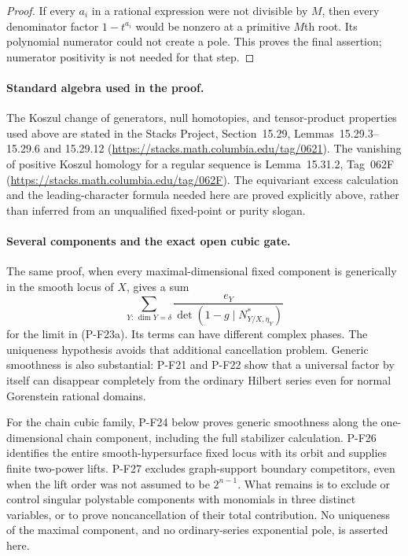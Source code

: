 \begin{proof}
If every $a_i$ in a rational expression were not divisible
by $M$, then every denominator factor $1-t^{a_i}$ would
be nonzero at a primitive $M$th root. Its polynomial numerator
could not create a pole. This proves the final assertion;
numerator positivity is not needed for that step.
\end{proof}

\paragraph{Standard algebra used in the proof.}
The Koszul change of generators, null homotopies, and tensor-product
properties used above are stated in the Stacks Project,
Section~15.29, Lemmas~15.29.3--15.29.6 and 15.29.12
(\url{https://stacks.math.columbia.edu/tag/0621}). The vanishing
of positive Koszul homology for a regular sequence is
Lemma~15.31.2, Tag~062F
(\url{https://stacks.math.columbia.edu/tag/062F}). The
equivariant excess calculation and the leading-character formula
needed here are proved explicitly above, rather than inferred
from an unqualified fixed-point or purity slogan.

\paragraph{Several components and the exact open cubic gate.}
The same proof, when every maximal-dimensional fixed component
is generically in the smooth locus of $X$, gives a sum
\[
 \sum_{Y:\,\dim Y=\delta}
       \frac{e_Y}{\det(1-g\mid N^*_{Y/X,\eta_Y})}
 \tag{P-F23g}
\]
for the limit in (P-F23a). Its terms can have different complex
phases. The uniqueness hypothesis avoids that additional
cancellation problem. Generic smoothness is also substantial:
P-F21 and P-F22 show that a universal factor by itself can
disappear completely from the ordinary Hilbert series even
for normal Gorenstein rational domains.

For the chain cubic family, P-F24 below proves generic smoothness
along the one-dimensional chain component, including the full
stabilizer calculation. P-F26 identifies the entire smooth-hypersurface
fixed locus with its orbit and supplies finite two-power lifts.
P-F27 excludes graph-support boundary competitors, even when the
lift order was not assumed to be $2^{n-1}$. What remains is to
exclude or control singular polystable components with monomials
in three distinct variables, or to prove noncancellation of their
total contribution. No uniqueness of the maximal component, and
no ordinary-series exponential pole, is asserted here.
